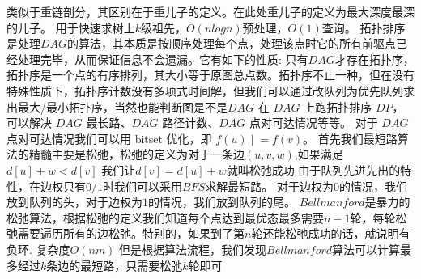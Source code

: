 {}类似于重链剖分，其区别在于重儿子的定义。在此处重儿子的定义为最大深度最深的儿子。\markdownRendererParagraphSeparator
{}用于快速求树上$ k $级祖先，$ O(nlogn) $预处理，$ O(1) $查询。\markdownRendererInterblockSeparator
{}\markdownRendererInterblockSeparator
{}
\markdownRendererSectionEnd 
\markdownRendererSectionEnd \markdownRendererSectionBegin
{}\markdownRendererInterblockSeparator
{}拓扑排序是处理$ DAG $的算法，其本质是按顺序处理每个点，处理该点时它的所有前驱点已经处理完毕，从而保证信息不会遗漏。它有如下的性质:\markdownRendererParagraphSeparator
{}只有$ DAG $才存在拓扑序，拓扑序是一个点的有序排列，其大小等于原图总点数。拓扑序不止一种，但在没有特殊性质下，拓扑序计数没有多项式时间解，但我们可以通过改队列为优先队列求出最大/最小拓扑序，当然也能判断图是不是$ DAG $\markdownRendererParagraphSeparator
{}在 $DAG$ 上跑拓扑排序 $DP$，可以解决 $DAG$ 最长路、$DAG$ 路径计数、$DAG$ 点对可达情况等等。\markdownRendererParagraphSeparator
{}对于 $DAG$ 点对可达情况我们可以用 bitset 优化，即 $f(u) \mathrel{|}= f(v)$。\markdownRendererInterblockSeparator
{}\markdownRendererInterblockSeparator
{}
\markdownRendererSectionEnd \markdownRendererSectionBegin
{}\markdownRendererInterblockSeparator
{}\markdownRendererSectionBegin
{}\markdownRendererInterblockSeparator
{}首先我们最短路算法的精髓主要是松弛，松弛的定义为对于一条边$ (u,v,w) $,如果满足$ d[u]+w<d[v] $\markdownRendererParagraphSeparator
{}我们让$ d[v]=d[u]+w $就叫松弛成功\markdownRendererInterblockSeparator
{}\markdownRendererSectionBegin
{}\markdownRendererInterblockSeparator
{}由于队列先进先出的特性，在边权只有$ 0/1 $时我们可以采用$ BFS $求解最短路。\markdownRendererParagraphSeparator
{}对于边权为$ 0 $的情况，我们放到队列的头，对于边权为$ 1 $的情况，我们放到队列的尾。\markdownRendererInterblockSeparator
{}
\markdownRendererSectionEnd \markdownRendererSectionBegin
{}\markdownRendererInterblockSeparator
{}$ Bellmanford $是暴力的松弛算法，根据松弛的定义我们知道每个点达到最优态最多需要$ n-1 $轮，每轮松弛需要遍历所有的边松弛。特别的，如果到了第$ n $轮还能松弛成功的话，就说明有负环.\markdownRendererParagraphSeparator
{}复杂度$ O(nm) $\markdownRendererParagraphSeparator
{}但是根据算法流程，我们发现$ Bellmanford $算法可以计算最多经过$ k $条边的最短路，只需要松弛$ k $轮即可\markdownRendererInterblockSeparator
